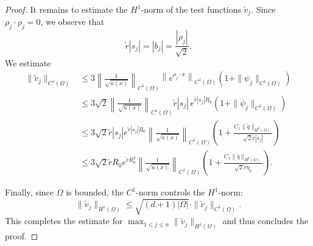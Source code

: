 \documentclass[10pt,a4paper]{amsart}
\begin{document}
\begin{proof}
It remains to estimate the $H^1$-norm of the test functions $\tilde{v}_j$. Since $\rho_j \cdot \rho_j = 0$, we observe that
\[
\tilde{r} |s_j| = |b_j| = \frac{|\rho_j|}{\sqrt{2}}.
\]
We estimate
\begin{align*}
    \|\tilde{v}_j\|_{C^1(\Omega)} 
    &\leq 3 \left\| \frac{1}{\sqrt{\kappa(x)}} \right\|_{C^1(\Omega)} 
    \left\| e^{\rho_j \cdot x} \right\|_{C^1(\Omega)} 
    \left( 1 + \|\psi_j\|_{C^1(\Omega)} \right) \\
    &\leq 3 \sqrt{2} \left\| \frac{1}{\sqrt{\kappa(x)}} \right\|_{C^1(\Omega)} 
    \tilde{r} |s_j|\, e^{\tilde{r} |s_j| R_0} 
    \left( 1 + \|\psi_j\|_{C^1(\Omega)} \right) \\
    &\leq 3 \sqrt{2} \tilde{r} |s_j| e^{\tilde{r} |s_j| R_0}\left\| \frac{1}{\sqrt{\kappa(x)}} \right\|_{C^1(\Omega)}
    \left( 1 + \frac{C_1 \|\tilde{q}\|_{H^p(\Omega)}}{\sqrt{2} \tilde{r} |s_j|} \right) \\
    &\leq 3 \sqrt{2} \tilde{r} R_0 e^{\tilde{r} R_0^2}\left\| \frac{1}{\sqrt{\kappa(x)}} \right\|_{C^1(\Omega)}
    \left( 1 + \frac{C_1 \|\tilde{q}\|_{H^p(\Omega)}}{\sqrt{2} \tilde{r} \eta_2} \right).
\end{align*}

Finally, since $\Omega$ is bounded, the $C^1$-norm controls the $H^1$-norm:
\[
\|\tilde{v}_j\|_{H^1(\Omega)} \leq \sqrt{(d + 1) |\Omega|} \cdot \|\tilde{v}_j\|_{C^1(\Omega)}.
\]
This completes the estimate for $\max_{1 \leq j \leq n} \|\tilde{v}_j\|_{H^1(\Omega)}$ and thus concludes the proof.
\end{proof}
\end{document}

